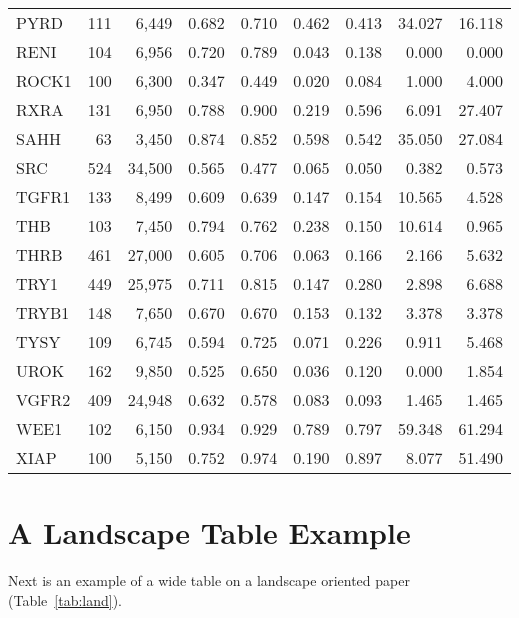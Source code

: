 \begin{center}
\begin{longtable}{lrrrrrrrr}
			PYRD   & 111   & 6,449    & 0.682   & 0.710   & 0.462   & 0.413   & 34.027  & 16.118 \\
			RENI   & 104   & 6,956    & 0.720   & 0.789   & 0.043   & 0.138   & 0.000   & 0.000  \\
			ROCK1  & 100   & 6,300    & 0.347   & 0.449   & 0.020   & 0.084   & 1.000   & 4.000  \\
			RXRA   & 131   & 6,950    & 0.788   & 0.900   & 0.219   & 0.596   & 6.091   & 27.407 \\
			SAHH   & 63    & 3,450    & 0.874   & 0.852   & 0.598   & 0.542   & 35.050  & 27.084 \\
			SRC    & 524   & 34,500   & 0.565   & 0.477   & 0.065   & 0.050   & 0.382   & 0.573  \\
			TGFR1  & 133   & 8,499    & 0.609   & 0.639   & 0.147   & 0.154   & 10.565  & 4.528  \\
			THB    & 103   & 7,450    & 0.794   & 0.762   & 0.238   & 0.150   & 10.614  & 0.965  \\
			THRB   & 461   & 27,000   & 0.605   & 0.706   & 0.063   & 0.166   & 2.166   & 5.632  \\
			TRY1   & 449   & 25,975   & 0.711   & 0.815   & 0.147   & 0.280   & 2.898   & 6.688  \\
			TRYB1  & 148   & 7,650    & 0.670   & 0.670   & 0.153   & 0.132   & 3.378   & 3.378  \\
			TYSY   & 109   & 6,745    & 0.594   & 0.725   & 0.071   & 0.226   & 0.911   & 5.468  \\
			UROK   & 162   & 9,850    & 0.525   & 0.650   & 0.036   & 0.120   & 0.000   & 1.854  \\
			VGFR2  & 409   & 24,948   & 0.632   & 0.578   & 0.083   & 0.093   & 1.465   & 1.465  \\
			WEE1   & 102   & 6,150    & 0.934   & 0.929   & 0.789   & 0.797   & 59.348  & 61.294 \\
			XIAP   & 100   & 5,150    & 0.752   & 0.974   & 0.190   & 0.897   & 8.077   & 51.490 \\
			\bottomrule
		\end{longtable}
	
	\endgroup
\end{center}

\blindtext

\section{A Landscape Table Example}
Next is an example of a wide table on a landscape oriented paper (Table~\ref{tab:land}).

